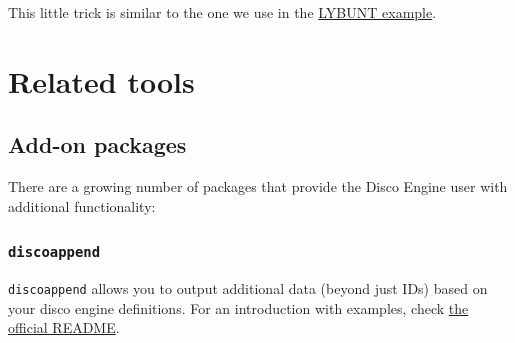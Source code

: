 \documentclass[]{book}
\newenvironment{Shaded}{\begin{snugshade}}{\end{snugshade}}
\newcommand{\CommentTok}[1]{\textcolor[rgb]{0.56,0.35,0.01}{\textit{#1}}}
\newcommand{\DataTypeTok}[1]{\textcolor[rgb]{0.13,0.29,0.53}{#1}}
\newcommand{\KeywordTok}[1]{\textcolor[rgb]{0.13,0.29,0.53}{\textbf{#1}}}
\newcommand{\NormalTok}[1]{#1}
\newcommand{\OperatorTok}[1]{\textcolor[rgb]{0.81,0.36,0.00}{\textbf{#1}}}
\newcommand{\OtherTok}[1]{\textcolor[rgb]{0.56,0.35,0.01}{#1}}
\newcommand{\StringTok}[1]{\textcolor[rgb]{0.31,0.60,0.02}{#1}}
\begin{document}
\begin{Shaded}
\end{Shaded}

This little trick is similar to the one we use in the \protect\hyperlink{ex-lybunt}{LYBUNT example}.

\hypertarget{part-related-tools}{%
\part{Related tools}\label{part-related-tools}}

\hypertarget{add-on-packages}{%
\chapter{Add-on packages}\label{add-on-packages}}

There are a growing number of packages that provide the Disco Engine user with additional functionality:

\hypertarget{discoappend}{%
\section{\texorpdfstring{\texttt{discoappend}}{discoappend}}\label{discoappend}}

\texttt{discoappend} allows you to output additional data (beyond just IDs) based on your disco engine definitions. For an introduction with examples, check \href{https://github.com/cwolfsonseeley/discoappend\#discoappend}{the official README}.
\end{document}
